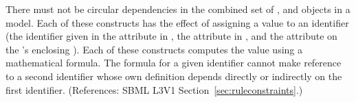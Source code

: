 There must not be circular dependencies in the combined set of
\InitialAssignment, \AssignmentRule and \KineticLaw objects in a model.
Each of these constructs has the effect of assigning a value to an
identifier (\ie the identifier given in the attribute  in
\InitialAssignment, the attribute  in \AssignmentRule, and
the attribute  on the \KineticLaw's enclosing \Reaction).  Each
of these constructs computes the value using a mathematical formula.  The
formula for a given identifier cannot make reference to a second identifier
whose own definition depends directly or indirectly on the first
identifier.  (References: SBML L3V1 Section~\ref{sec:ruleconstraints}.)
